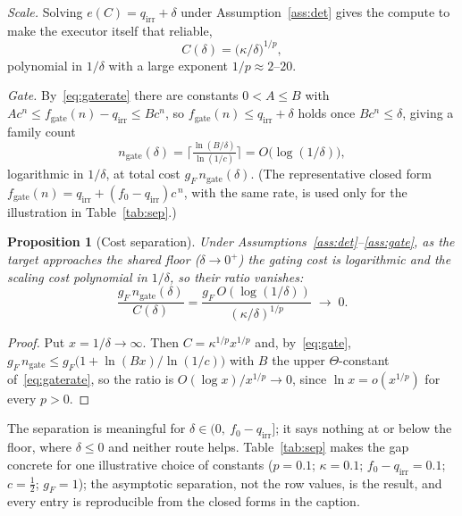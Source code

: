 \documentclass[11pt]{article}
\newtheorem{proposition}{Proposition}
\theoremstyle{definition}
\theoremstyle{remark}
\newcommand{\fesc}{f}
\begin{document}
\emph{Scale.} Solving $e(C)=q_{\mathrm{irr}}+\delta$ under Assumption~\ref{ass:det} gives the compute to make the
executor itself that reliable,
\begin{equation}\label{eq:det}
C(\delta)=\big(\kappa/\delta\big)^{1/p},
\end{equation}
polynomial in $1/\delta$ with a large exponent $1/p\approx2$--$20$.

\emph{Gate.} By~\eqref{eq:gaterate} there are constants $0<A\le B$ with
$A c^n\le f_{\mathrm{gate}}(n)-q_{\mathrm{irr}}\le B c^n$, so $f_{\mathrm{gate}}(n)\le q_{\mathrm{irr}}+\delta$
holds once $B c^n\le\delta$, giving a family count
\begin{equation}\label{eq:gate}
n_{\mathrm{gate}}(\delta)=\Big\lceil\tfrac{\ln(B/\delta)}{\ln(1/c)}\Big\rceil=O\!\big(\log(1/\delta)\big),
\end{equation}
logarithmic in $1/\delta$, at total cost $g_F\,n_{\mathrm{gate}}(\delta)$. (The representative closed
form $f_{\mathrm{gate}}(n)=q_{\mathrm{irr}}+(\fesc_0-q_{\mathrm{irr}})c^{\,n}$, with the same rate, is used
only for the illustration in Table~\ref{tab:sep}.)

\begin{proposition}[Cost separation]\label{prop:cost}
Under Assumptions~\ref{ass:det}--\ref{ass:gate}, as the target approaches the shared floor
($\delta\to0^+$) the gating cost is logarithmic and the scaling cost polynomial in $1/\delta$, so their
ratio vanishes:
\[
\frac{g_F\,n_{\mathrm{gate}}(\delta)}{C(\delta)}
=\frac{g_F\,O(\log(1/\delta))}{(\kappa/\delta)^{1/p}}\;\longrightarrow\;0 .
\]
\end{proposition}
\begin{proof}
Put $x=1/\delta\to\infty$. Then $C=\kappa^{1/p}x^{1/p}$ and, by~\eqref{eq:gate},
$g_F\,n_{\mathrm{gate}}\le g_F\big(1+\ln(Bx)/\ln(1/c)\big)$ with $B$ the upper $\Theta$-constant
of~\eqref{eq:gaterate}, so the ratio is $O(\log x)/x^{1/p}\to0$, since $\ln x=o(x^{1/p})$ for every $p>0$.
\end{proof}

The separation is meaningful for $\delta\in(0,\ \fesc_0-q_{\mathrm{irr}}]$; it says nothing at or below
the floor, where $\delta\le0$ and neither route helps. Table~\ref{tab:sep} makes the gap concrete for
one illustrative choice of constants ($p=0.1$; $\kappa=0.1$; $\fesc_0-q_{\mathrm{irr}}=0.1$;
$c=\tfrac12$; $g_F=1$);
the asymptotic separation, not the row values, is the result, and every entry is reproducible
from the closed forms in the caption.
\end{document}
